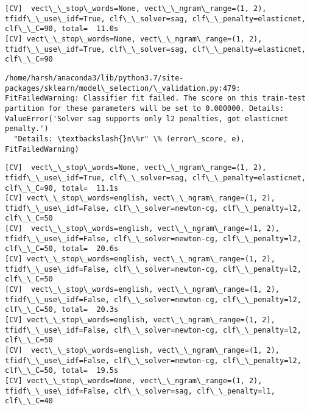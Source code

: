 \documentclass[11pt]{article}
\begin{document}
    \begin{Verbatim}[commandchars=\\\{\}]
[CV]  vect\_\_stop\_words=None, vect\_\_ngram\_range=(1, 2), tfidf\_\_use\_idf=True, clf\_\_solver=sag, clf\_\_penalty=elasticnet, clf\_\_C=90, total=  11.0s
[CV] vect\_\_stop\_words=None, vect\_\_ngram\_range=(1, 2), tfidf\_\_use\_idf=True, clf\_\_solver=sag, clf\_\_penalty=elasticnet, clf\_\_C=90 

    \end{Verbatim}

    \begin{Verbatim}[commandchars=\\\{\}]
/home/harsh/anaconda3/lib/python3.7/site-packages/sklearn/model\_selection/\_validation.py:479: FitFailedWarning: Classifier fit failed. The score on this train-test partition for these parameters will be set to 0.000000. Details: 
ValueError('Solver sag supports only l2 penalties, got elasticnet penalty.')
  "Details: \textbackslash{}n\%r" \% (error\_score, e), FitFailedWarning)

    \end{Verbatim}

    \begin{Verbatim}[commandchars=\\\{\}]
[CV]  vect\_\_stop\_words=None, vect\_\_ngram\_range=(1, 2), tfidf\_\_use\_idf=True, clf\_\_solver=sag, clf\_\_penalty=elasticnet, clf\_\_C=90, total=  11.1s
[CV] vect\_\_stop\_words=english, vect\_\_ngram\_range=(1, 2), tfidf\_\_use\_idf=False, clf\_\_solver=newton-cg, clf\_\_penalty=l2, clf\_\_C=50 
[CV]  vect\_\_stop\_words=english, vect\_\_ngram\_range=(1, 2), tfidf\_\_use\_idf=False, clf\_\_solver=newton-cg, clf\_\_penalty=l2, clf\_\_C=50, total=  20.6s
[CV] vect\_\_stop\_words=english, vect\_\_ngram\_range=(1, 2), tfidf\_\_use\_idf=False, clf\_\_solver=newton-cg, clf\_\_penalty=l2, clf\_\_C=50 
[CV]  vect\_\_stop\_words=english, vect\_\_ngram\_range=(1, 2), tfidf\_\_use\_idf=False, clf\_\_solver=newton-cg, clf\_\_penalty=l2, clf\_\_C=50, total=  20.3s
[CV] vect\_\_stop\_words=english, vect\_\_ngram\_range=(1, 2), tfidf\_\_use\_idf=False, clf\_\_solver=newton-cg, clf\_\_penalty=l2, clf\_\_C=50 
[CV]  vect\_\_stop\_words=english, vect\_\_ngram\_range=(1, 2), tfidf\_\_use\_idf=False, clf\_\_solver=newton-cg, clf\_\_penalty=l2, clf\_\_C=50, total=  19.5s
[CV] vect\_\_stop\_words=None, vect\_\_ngram\_range=(1, 2), tfidf\_\_use\_idf=False, clf\_\_solver=sag, clf\_\_penalty=l1, clf\_\_C=40 

    \end{Verbatim}
\end{document}
